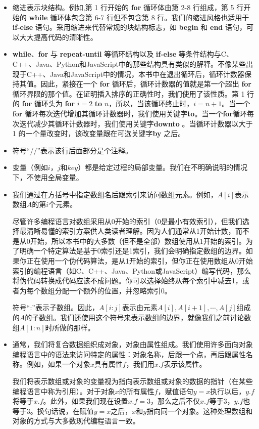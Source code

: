 \documentclass[lang=cn,newtx,10pt,scheme=chinese]{elegantbook}
\begin{document}
\begin{itemize}
    \item 缩进表示块结构。例如,第 1 行开始的 \textbf{for} 循环体由第 2-8 行组成，第 5 行开始的 \textbf{while} 循环体包含第 6-7 行但不包含第 8 行。我们的缩进风格也适用于 \textbf{if-else} 语句。采用缩进来代替常规的块结构标志，如 \textbf{begin} 和 \textbf{end} 语句，可以大大提高代码的清晰性。
    \item \textbf{while}、\textbf{for} 与 \textbf{repeat-until} 等循环结构以及 \textbf{if-else} 等条件结构与C、C++、Java、Python和JavaScript中的那些结构具有类似的解释。不像某些出现于C++、Java和JavaScript中的情况，本书中在退出循环后，循环计数器保持其值。因此，紧接在一个 \textbf{for} 循环后，循环计数器的值就是第一个超出 \textbf{for} 循环界限的那个值。在证明插入排序的正确性时，我们使用了该性质。第 1 行的 \textbf{for} 循环头为 \textbf{for} $i=2$ \textbf{to} $n$，所以，当该循环终止时，$i=n+1$。当一个 \textbf{for} 循环每次迭代增加其循环计数器时，我们使用关键字\textbf{to}。当一个\textbf{for}循环每次迭代减少其循环计数器时，我们使用关键字\textbf{downto} 。当循环计数器以大于 1 的一个量改变时，该改变量跟在可选关键字\textbf{by} 之后。
    \item 符号``//''表示该行后面部分是个注释。
    \item 变量（例如$i$，$j$和$key$）都是给定过程的局部变量。我们在不明确说明的情况下，不使用全局变量。
    \item 我们通过在方括号中指定数组名后跟索引来访问数组元素。例如，$A[i]$表示数组$A$的第$i$个元素。

    尽管许多编程语言对数组采用从0开始的索引（0是最小有效索引），但我们选择最清晰易懂的索引方案供人类读者理解。因为人们通常从1开始计数，而不是从0开始，所以本书中的大多数（但不是全部）数组使用从1开始的索引。为了明确一个特定算法是基于0索引还是1索引，我们会明确指定数组的边界。如果你正在使用一个伪代码算法，是从1开始的索引，但你正在使用数组从0开始索引的编程语言（如C、C++、Java、Python或JavaScript）编写代码，那么将伪代码转换成代码应该不成问题。你可以选择始终从每个索引中减去1，或者为每个数组分配一个额外的位置，并忽略索引0。

    符号``:''表示子数组。因此，$A[i:j]$表示由元素$A[i],A[i+1],\cdots,A[j]$组成的$A$的子数组。我们还使用这个符号来表示数组的边界，就像我们之前讨论数组$A[1:n]$时所做的那样。
    \item 通常，我们将复合数据组织成对象，对象由属性组成。我们使用许多面向对象编程语言中的语法来访问特定的属性：对象名称，后跟一个点，再后跟属性名称。例如，如果一个对象$x$具有属性$f$，我们用$x.f$表示该属性。

    我们将表示数组或对象的变量视为指向表示数组或对象的数据的指针（在某些编程语言中称为引用）。对于对象$x$的所有属性$f$，赋值语句$y=x$执行以后，$y.f$将等于$x.f$。此外，如果我们现在设置$x.f = 3$，那么之后不仅$x.f$等于3，$y.f$也等于3。换句话说，在赋值$y = x$之后，$x$和$y$指向同一个对象。这种处理数组和对象的方式与大多数现代编程语言一致。


\end{itemize}
\end{document}
